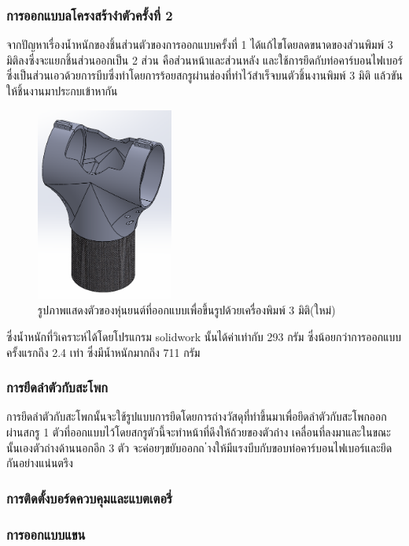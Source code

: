 \subsubsection{การออกแบบลโครงสร้างำตัวครั้งที่ 2}
จากปัญหาเรื่องน้ำหนักของชิ้นส่วนตัวของการออกแบบครั้งที่ 1 ได้แก้ไขโดยลดขนาดของส่วนพิมพ์ 3 มิติลงซึ่งจะแยกชิ้นส่วนออกเป็น 2 ส่วน คือส่วนหน้าและส่วนหลัง
และใช้การยึดกับท่อคาร์บอนไฟเบอร์ซึ่งเป็นส่วนเอวด้วยการบีบซึ่งทำโดยการร้อยสกรูผ่านช่องที่ทำไว้สำเร็จบนตัวชิ้นงานพิมพ์ 3 มิติ แล้วขันให้ชิ้นงานมาประกบเข้าหากัน
\begin{figure}[!ht]
  \centering
  \includegraphics[width=0.4\textwidth]{chapter4/images/troso_new.PNG}
  \caption{รูปภาพแสดงตัวของหุ่นยนต์ที่ออกแบบเพื่อขึ้นรูปด้วยเครื่องพิมพ์ 3 มิติ(ใหม่)}
  \label{fig:torso_new}
\end{figure}
ซึ่งน้ำหนักที่วิเคราะห์ได้โดยโปรแกรม solidwork นั้นได้ค่าเท่ากับ 293 กรัม ซึ่งน้อยกว่าการออกแบบครั้งแรกถึง 2.4 เท่า ซึ่งมีน้ำหนักมากถึง 711 กรัม
\subsubsection*{การยึดลำตัวกับสะโพก}
การยึดลำตัวกับสะโพกนั้นจะใช้รูปแบบการยึดโดยการถ่างวัสดุที่ทำขึ้นมาเพื่อยึดลำตัวกับสะโพกออกผ่านสกรู 1 ตัวที่ออกแบบไว้โดยสกรูตัวนี้จะทำหน้าที่ดึงให้ถ้วยของตัวถ่าง
เคลื่อนที่ลงมาและในขณะนั้นเองตัวถ่างด้านนอกอีก 3 ตัว จะค่อยๆขยับออกถ ่างให้มีแรงบีบกับขอบท่อคาร์บอนไฟเบอร์และยึดกันอย่างแน่นตรึง

\subsubsection*{การติดตั้งบอร์ดควบคุมและแบตเตอรี่}

\subsubsection{การออกแบบแขน}


